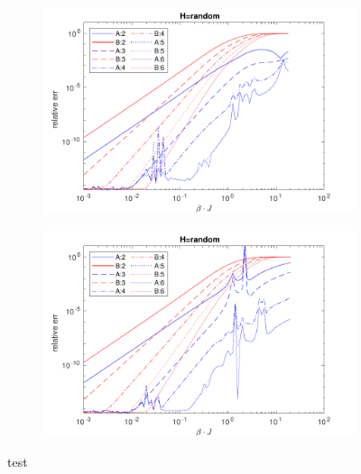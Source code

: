 \begin{figure}[H]
    \begin{subfigure}[]{\textwidth}
        \includegraphics[width=\textwidth]{Figuren/benchmarking/random_copmAB6.pdf}
    \end{subfigure}

    \medskip

    \begin{subfigure}[]{\textwidth}
        \includegraphics[width=\textwidth]{Figuren/benchmarking/random_copmAB6_2.pdf}
    \end{subfigure}

    \caption{test }
\end{figure}

